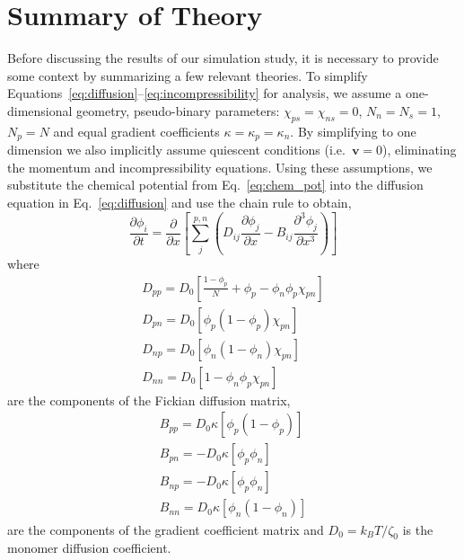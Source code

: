 \documentclass[journal=mamobx, layout=twocolumn]{achemso}
\begin{document}
\section{Summary of Theory}
Before discussing the results of our simulation study, it is necessary to provide some context by summarizing a few relevant theories.
To simplify Equations~\ref{eq:diffusion}--\ref{eq:incompressibility} for analysis, we assume a one-dimensional geometry, pseudo-binary parameters: $\chi_{ps} = \chi_{ns} = 0$, $N_{n} = N_{s} = 1$, $N_{p} = N$ and equal gradient coefficients $\kappa = \kappa_{p} = \kappa_{n}$.
By simplifying to one dimension we also implicitly assume quiescent conditions (i.e.\ $\bm{v} = 0$), eliminating the momentum and incompressibility equations.
Using these assumptions, we substitute the chemical potential from Eq.~\ref{eq:chem_pot} into the diffusion equation in Eq.~\ref{eq:diffusion} and use the chain rule to obtain,
\begin{equation} \label{eq:1D_diffusion}
\frac{\partial \phi_{i}}{\partial t} =  \frac{\partial}{\partial x} \left [ \sum_{j}^{p,n} \left ( D_{ij} \frac{\partial \phi_{j}}{\partial x} - B_{ij} \frac{\partial^{3} \phi_{j}}{\partial x^{3}} \right ) \right ]
\end{equation}
where 
\begin{subequations} \label{eq:Dmatrix}
\begin{eqnarray}
D_{pp} = D_{0} \left [ \frac{1-\phi_{p}}{N} + \phi_{p} - \phi_{n} \phi_{p} \chi_{pn} \right ] \label{eq:Dpp} \\
D_{pn} = D_{0}  \left [ \phi_{p} (1-\phi_{p}) \chi_{pn} \right ] \label{eq:Dpn} \\
D_{np} = D_{0} \left [ \phi_{n} (1-\phi_{n}) \chi_{pn} \right ] \label{eq:Dnp} \\
D_{nn} = D_{0} \left [ 1 - \phi_{n} \phi_{p} \chi_{pn} \right ] \label{eq:Dnn}
\end{eqnarray}
\end{subequations}
are the components of the Fickian diffusion matrix, 
\begin{subequations} \label{eq:Bmatrix}
\begin{eqnarray}
B_{pp} = D_{0} \kappa \left [\phi_{p} (1-\phi_{p}) \right ] \label{eq:Bpp} \\
B_{pn} = - D_{0} \kappa \left [\phi_{p} \phi_{n} \right ] \label{eq:Bpn} \\
B_{np} = - D_{0} \kappa \left [\phi_{p} \phi_{n} \right ] \label{eq:Bnp} \\
B_{nn} = D_{0} \kappa \left [\phi_{n} (1-\phi_{n}) \right ] \label{eq:Bnn}
\end{eqnarray}
\end{subequations}
are the components of the gradient coefficient matrix and $D_{0} = k_{B} T/\zeta_{0}$ is the monomer diffusion coefficient.
\end{document}
